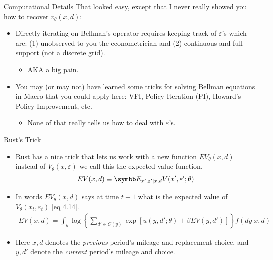 \documentclass[aspectratio=169,11pt]{beamer}
\begin{document}
\begin{frame}{Computational Details}
That looked easy, except that I never really showed you how to recover $v_{\theta}(x,d)$:
\begin{itemize}
\item Directly iterating on Bellman's operator requires keeping track of $\varepsilon$'s which are: (1) unobserved to you the econometrician and (2) continuous and full support (not a discrete grid).
\begin{itemize}
\item AKA a big pain.
\end{itemize}
\item You may (or may not) have learned some tricks for solving Bellman equations in Macro that you could apply here: VFI, Policy Iteration (PI), Howard's Policy Improvement, etc.
\begin{itemize}
\item None of that really tells us how to deal with $\varepsilon$'s.
\end{itemize}
\end{itemize}
\end{frame}

\begin{frame}{Rust's Trick}\

\begin{itemize}
\item Rust has a nice trick that lets us work with a new function $EV_{\theta}(x,d)$ instead of $V_{\theta}(x,\varepsilon)$ we call this the \alert{expected value function}.
\begin{eqnarray*}
EV(x, d) \equiv \E_{x', \varepsilon ' | x, d} V(x', \varepsilon ' ; \theta)
\end{eqnarray*}
\item In words $EV_{\theta}(x,d)$ says at time $t-1$ what is the expected value of $V_{\theta}(x_t,\varepsilon_t)$ [eq 4.14].
\begin{align*}
EV(x,d) = \int_y \log \left \{ \sum_{d' \in C(y)} \exp [ u(y,d'; \theta) + \beta EV(y, d')] \right \} f(dy|x,d)
\end{align*}
\item Here $x, d$ denotes the \emph{previous} period's mileage and replacement choice, and $y, d'$ denote the \emph{current} period's mileage and choice.
\end{itemize}
\end{frame}
\end{document}
